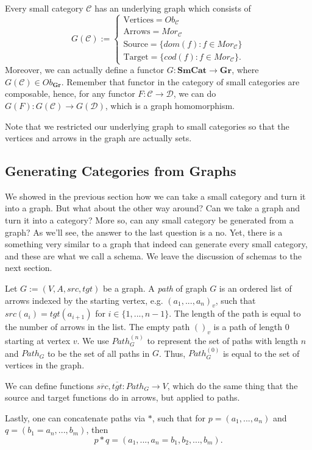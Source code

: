 \begin{definition}
  Every small category $\mathcal C$ has an underlying graph which consists of
  \begin{displaymath}
  G(\mathcal C) := \begin{cases}
    \text{Vertices} = Ob_\mathcal C \\
    \text{Arrows} = Mor_\mathcal C \\
    \text{Source} = \{dom(f)  : f \in Mor_\mathcal C\} \\
    \text{Target} = \{cod(f)  : f \in Mor_\mathcal C\}.
    \end{cases}
  \end{displaymath}
  Moreover, we can actually define a functor $G : \mathbf{SmCat} \to \mathbf{Gr}$,
  where $G(\mathcal C) \in Ob_{\mathbf{Gr}}$. Remember that functor in the 
  category of small categories are composable, hence, for any 
  functor $F:\mathcal C \to \mathcal D$, we can do
  $G(F):G(\mathcal C) \to G(\mathcal D)$, which is a graph homomorphism.
\end{definition}

Note that we restricted our underlying graph to small categories so that
the vertices and arrows in the graph are actually sets.

\subsection{Generating Categories from Graphs}

We showed in the previous section how we can take a small category and turn it
into a graph. But what about the other way around? Can we take a graph and turn it
into a category? More so, can any small category be generated from a graph?
As we'll see, the answer to the last question is a no. Yet, there is a
something very similar to a graph that indeed can generate every small category,
and these are what we call a schema. We leave the discussion of schemas to the next section.

\begin{definition}
  Let $G:=(V, A, src, tgt)$ be a graph. A \textit{path} of graph $G$
  is an ordered list of arrows indexed by the starting vertex, e.g. $(a_1,..., a_n)_v$,
  such that $src(a_i) = tgt(a_{i+1})$ for $i \in\{1,...,n-1\}$.
  The length of the path is equal to the
  number of arrows in the list. The empty path $()_v$ is a path of length 0 starting at vertex $v$.
  We use $Path^{(n)}_G$ to represent the set of paths with length $n$
  and $Path_G$ to be the set of all paths in $G$. Thus, $Path^{(0)}_G$ is equal to the set of vertices
  in the graph.

  We can define functions $\overline{src}, \overline{tgt}:Path_G \to V$,
  which do the same thing that the source and target functions do in arrows,
  but applied to paths.

  Lastly, one can concatenate paths via $*$, such that
  for $p = (a_1,...,a_n)$ and $q = (b_1=a_n,...,b_m)$, then
  \begin{displaymath}
    p * q = (a_1,...,a_n=b_1, b_2,...,b_m).
  \end{displaymath}
\end{definition}

